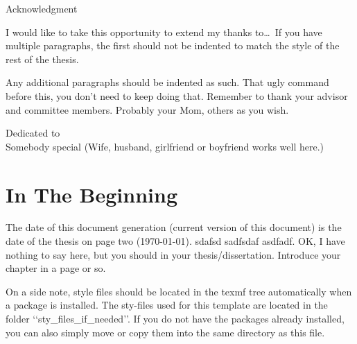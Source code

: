 \documentclass[12pt]{report}
\begin{document}
\begin{singlespace}
\tableofcontents
\listoffigures
\listoftables
\end{singlespace}
%
\newpage
\thispagestyle{plain}
\setlength{\parindent}{0em}
\begin{center}
{\huge Acknowledgment}
\end{center}

I would like to take this opportunity to extend my thanks to\ldots\  If you have multiple paragraphs, the first should not be indented to match the style of the rest of the thesis.

\setlength{\parindent}{2em}
Any additional paragraphs should be indented as such.  That ugly command before this, you don't need to keep doing that. Remember to thank your advisor and committee members. Probably your Mom, others as you wish. 
%
\newpage
\thispagestyle{plain}
\vspace*{3in}
\begin{center}
Dedicated to\\
Somebody special (Wife, husband, girlfriend or boyfriend works well
here.)
\end{center}
%
%
%
\newpage
\setcounter{page}{1}
\setlength{\parindent}{2em}
\chapter{In The Beginning}
The date of this document generation (current version of this document) is the date of the thesis on page two (\today).{}
sdafsd sadfsdaf asdfadf. OK, I have nothing to say here, but you should in your thesis/dissertation. Introduce your chapter in a page or so.

On a side note, style files should be located in the texmf tree automatically when a package is installed.  The sty-files used for this template are located in the folder \lq\lq{}sty\_files\_if\_needed\rq\rq{}.  If you do not have the packages already installed, you can also simply move or copy them into the same directory as this file.

\end{document}
